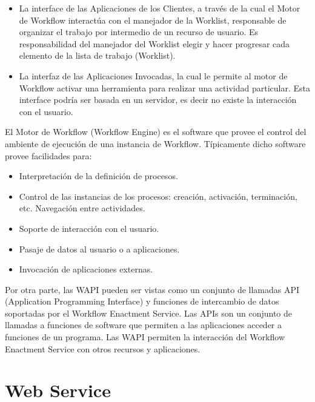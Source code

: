 \begin{itemize}
	\item La interface de las Aplicaciones de los Clientes, a través de la cual el Motor de Workflow interactúa con el manejador de la Worklist, responsable de organizar el trabajo por intermedio de un recurso de usuario. Es responsabilidad del manejador del Worklist elegir y hacer progresar cada elemento de la lista de trabajo (Worklist).
	
	\item La interfaz de las Aplicaciones Invocadas, la cual le permite al motor de Workflow activar una herramienta para realizar una actividad particular. Esta interface podría ser basada en un servidor, es decir no existe la interacción con el usuario.
	
\end{itemize}

El Motor de Workflow (Workflow Engine) es el software que provee el control del ambiente de ejecución de una instancia de Workflow. Típicamente dicho software provee facilidades para:

\begin{itemize}
	\item Interpretación de la definición de procesos.
	
	\item Control de las instancias de los procesos: creación, activación, terminación, etc. Navegación entre actividades.
	
	\item Soporte de interacción con el usuario.
	
	\item Pasaje de datos al usuario o a aplicaciones.
	
	\item Invocación de aplicaciones externas.
\end{itemize}

Por otra parte, las WAPI pueden ser vistas como un conjunto de llamadas API (Application Programming Interface) y funciones de intercambio de datos soportadas por el Workflow Enactment Service. Las APIs son un conjunto de llamadas a funciones de software que permiten a las aplicaciones acceder a funciones de un programa. Las WAPI permiten la interacción del Workflow Enactment Service con otros recursos y aplicaciones.

\section{Web Service}
\label{Web Service}

